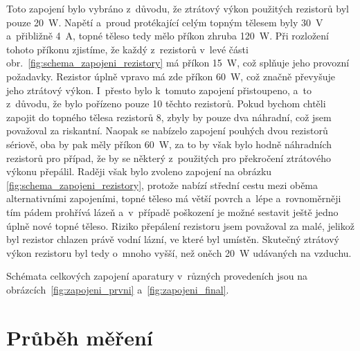 \documentclass[12pt]{article}
\begin{document}
Toto zapojení bylo vybráno z~důvodu, že ztrátový výkon použitých rezistorů byl pouze \SI{20}{\watt}. Napětí a~proud protékající celým topným tělesem byly \SI{30}{\volt} a~přibližně \SI{4}{\ampere}, topné těleso tedy mělo příkon zhruba \SI{120}{\watt}. Při rozložení tohoto příkonu zjistíme, že každý z~rezistorů v~levé části obr.~\ref{fig:schema_zapojeni_rezistory} má příkon \SI{15}{\watt}, což splňuje jeho provozní požadavky. Rezistor úplně vpravo má zde příkon \SI{60}{\watt}, což značně převyšuje jeho ztrátový výkon. I~přesto bylo k~tomuto zapojení přistoupeno, a~to z~důvodu, že bylo pořízeno pouze 10 těchto rezistorů. Pokud bychom chtěli zapojit do topného tělesa rezistorů 8, zbyly by pouze dva náhradní, což jsem považoval za riskantní. Naopak se nabízelo zapojení pouhých dvou rezistorů sériově, oba by pak měly příkon \SI{60}{\watt}, za to by však bylo hodně náhradních rezistorů pro případ, že by se některý z~použitých pro překročení ztrátového výkonu přepálil. Raději však bylo zvoleno zapojení na obrázku \ref{fig:schema_zapojeni_rezistory}, protože nabízí střední cestu mezi oběma alternativními zapojeními, topné těleso má větší povrch a~lépe a~rovnoměrněji tím pádem prohřívá lázeň a~v~případě poškození je možné sestavit ještě jedno úplně nové topné těleso. Riziko přepálení rezistoru jsem považoval za malé, jelikož byl rezistor chlazen právě vodní lázní, ve které byl umístěn. Skutečný ztrátový výkon rezistoru byl tedy o~mnoho vyšší, než oněch \SI{20}{\watt} udávaných na vzduchu.
\par\noindent
Schémata celkových zapojení aparatury v~různých provedeních jsou na obrázcích~\ref{fig:zapojeni_prvni} a~\ref{fig:zapojeni_final}.

\newpage%
\section{Průběh měření}%
\end{document}
